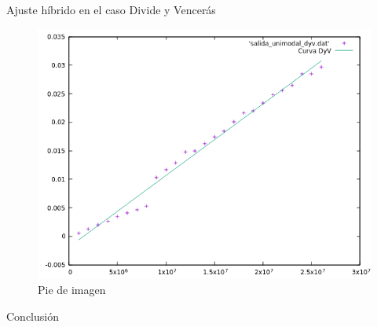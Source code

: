 \documentclass[12pt]{beamer}
\begin{document}
\begin{frame}{Ajuste híbrido en el caso Divide y Vencerás}

\begin{figure}[H] 
\centering
\includegraphics[angle=0,scale=0.5]{img/AjusteHibridoDyV.png} 
\caption{Pie de imagen} 
\end{figure}

\end{frame}

\begin{frame}{Conclusión}

\end{frame}
\end{document}
